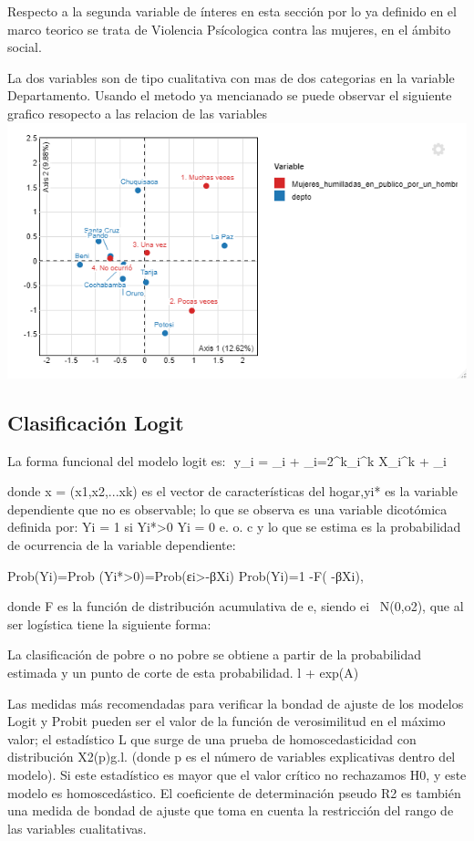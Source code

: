 \documentclass[11pt,letter]{article}
\begin{document}
Respecto a la segunda variable de ínteres en esta sección por lo ya definido en el marco teorico se trata de Violencia Psícologica contra las mujeres, en el ámbito social. 

La dos variables son de tipo cualitativa con mas de dos categorias en la variable Departamento. Usando el metodo ya mencianado se puede observar el siguiente grafico resopecto a las relacion de las variables
\includegraphics{analisis_corres.png}

\subsection{Clasificación Logit}
La forma funcional del modelo logit es:
$$ y_i = \beta_i + \sum_{i=2}^{k}\beta_i^k X_i^k + \epsilon_i


donde x = (x1,x2,...xk) es el vector de características del hogar,yi* es la variable dependiente que no es observable; lo que se observa es una variable dicotómica definida por: Yi = 1 si Yi*>0 Yi = 0 e. o. c y lo que se estima es la probabilidad de ocurrencia de la variable dependiente:

Prob(Yi)=Prob (Yi*>0)=Prob(εi>-βXi)
Prob(Yi)=1 -F( -βXi),

donde F es la función de distribución acumulativa de e, siendo ei ~N(0,o2), que al ser logística tiene la siguiente forma:



La clasificación de pobre o no pobre se obtiene a partir de la probabilidad estimada  y un punto de corte de esta probabilidad. l + exp(A)

Las medidas más recomendadas para verificar la bondad de ajuste de los modelos Logit y Probit pueden ser el valor de la función de verosimilitud en el máximo valor; el estadístico L que surge de una prueba de homoscedasticidad con distribución X2(p)g.l. (donde p es el número de variables explicativas dentro del modelo). Si este estadístico es mayor que el valor crítico no rechazamos H0, y este modelo es homoscedástico. El coeficiente de determinación pseudo R2 es también una medida de bondad de ajuste que toma en cuenta la restricción del rango de las variables cualitativas.
\end{document}
